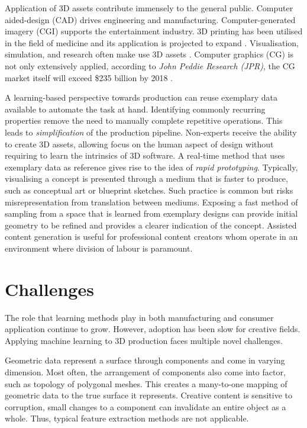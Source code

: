 \documentclass[a4paper, fontsize=15pt, onecolumn]{article} %
\numberwithin{equation}{section} %
\numberwithin{figure}{section} %
\numberwithin{table}{section} %
\begin{document}
Application of 3D assets contribute immensely to the general public.
Computer aided-design (CAD) drives engineering and manufacturing.
Computer-generated imagery (CGI) supports the entertainment industry.
3D printing has been utilised in the field of medicine and its application is projected to expand \cite{3dprinting}.
Visualisation, simulation, and research often make use 3D assets \cite{simulation}.
Computer graphics (CG) is not only extensively applied, according to \textit{John Peddie Research (JPR)}, the CG market itself will exceed \$235 billion by 2018 \cite{cgmarket}.

A learning-based perspective towards production can reuse exemplary data available to automate the task at hand.
Identifying commonly recurring properties remove the need to manually complete repetitive operations. This leads to \textit{simplification} of the production pipeline. Non-experts receive the ability to create 3D assets, allowing focus on the human aspect of design without requiring to learn the intrinsics of 3D software. 
A real-time method that uses exemplary data as reference gives rise to the idea of \textit{rapid prototyping}. Typically, visualising a concept is presented through a medium that is faster to produce, such as conceptual art or blueprint sketches. Such practice is common but risks misrepresentation from translation between mediums. Exposing a fast method of sampling from a space that is learned from exemplary designs can provide initial geometry to be refined and provides a clearer indication of the concept. Assisted content generation is useful for professional content creators whom operate in an environment where division of labour is paramount.

\section{Challenges}
The role that learning methods play in both manufacturing and consumer application continue to grow. However, adoption has been slow for creative fields. Applying machine learning to 3D production faces multiple novel challenges. 

Geometric data represent a surface through components and come in varying dimension. Most often, the arrangement of components also come into factor, such as topology of polygonal meshes. This creates a many-to-one mapping of geometric data to the true surface it represents. Creative content is sensitive to corruption, small changes to a component can invalidate an entire object as a whole. Thus, typical feature extraction methods are not applicable.
\end{document}
